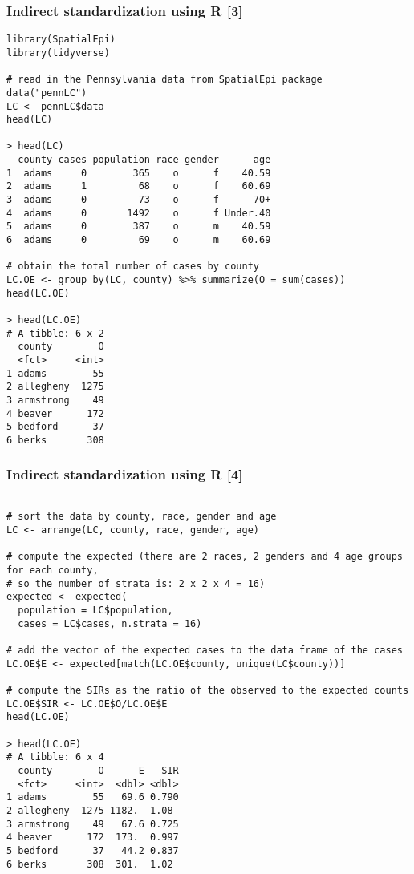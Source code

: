 \documentclass[12pt]{beamer}
\begin{document}
\begin{frame} [fragile]
\frametitle{Indirect standardization using R [3]}
\begin{tiny}
\begin{verbatim}
library(SpatialEpi)
library(tidyverse)

# read in the Pennsylvania data from SpatialEpi package
data("pennLC")
LC <- pennLC$data
head(LC)

> head(LC)
  county cases population race gender      age
1  adams     0        365    o      f    40.59
2  adams     1         68    o      f    60.69
3  adams     0         73    o      f      70+
4  adams     0       1492    o      f Under.40
5  adams     0        387    o      m    40.59
6  adams     0         69    o      m    60.69

# obtain the total number of cases by county
LC.OE <- group_by(LC, county) %>% summarize(O = sum(cases))
head(LC.OE)

> head(LC.OE)
# A tibble: 6 x 2
  county        O
  <fct>     <int>
1 adams        55
2 allegheny  1275
3 armstrong    49
4 beaver      172
5 bedford      37
6 berks       308

\end{verbatim}
\end{tiny}
\end{frame}



\begin{frame} [fragile]
\frametitle{Indirect standardization using R [4]}
\begin{tiny}
\begin{verbatim}

# sort the data by county, race, gender and age
LC <- arrange(LC, county, race, gender, age)

# compute the expected (there are 2 races, 2 genders and 4 age groups for each county,
# so the number of strata is: 2 x 2 x 4 = 16)
expected <- expected(
  population = LC$population,
  cases = LC$cases, n.strata = 16)

# add the vector of the expected cases to the data frame of the cases
LC.OE$E <- expected[match(LC.OE$county, unique(LC$county))]

# compute the SIRs as the ratio of the observed to the expected counts
LC.OE$SIR <- LC.OE$O/LC.OE$E
head(LC.OE)

> head(LC.OE)
# A tibble: 6 x 4
  county        O      E   SIR
  <fct>     <int>  <dbl> <dbl>
1 adams        55   69.6 0.790
2 allegheny  1275 1182.  1.08
3 armstrong    49   67.6 0.725
4 beaver      172  173.  0.997
5 bedford      37   44.2 0.837
6 berks       308  301.  1.02

\end{verbatim}
\end{tiny}
\end{frame}
\end{document}
